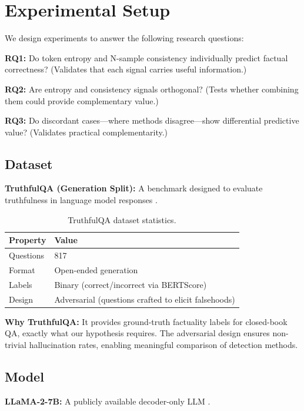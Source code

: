 \section{Experimental Setup}
\label{sec:experiments}

We design experiments to answer the following research questions:

\textbf{RQ1:} Do token entropy and N-sample consistency individually predict factual correctness? (Validates that each signal carries useful information.)

\textbf{RQ2:} Are entropy and consistency signals orthogonal? (Tests whether combining them could provide complementary value.)

\textbf{RQ3:} Do discordant cases---where methods disagree---show differential predictive value? (Validates practical complementarity.)

\subsection{Dataset}

\textbf{TruthfulQA (Generation Split):} A benchmark designed to evaluate truthfulness in language model responses \citep{lin2022truthfulqa}.

\begin{table}[h]
\centering
\begin{tabular}{@{}ll@{}}
\toprule
\textbf{Property} & \textbf{Value} \\
\midrule
Questions & 817 \\
Format & Open-ended generation \\
Labels & Binary (correct/incorrect via BERTScore) \\
Design & Adversarial (questions crafted to elicit falsehoods) \\
\bottomrule
\end{tabular}
\caption{TruthfulQA dataset statistics.}
\label{tab:dataset}
\end{table}

\textbf{Why TruthfulQA:} It provides ground-truth factuality labels for closed-book QA, exactly what our hypothesis requires. The adversarial design ensures non-trivial hallucination rates, enabling meaningful comparison of detection methods.

\subsection{Model}

\textbf{LLaMA-2-7B:} A publicly available decoder-only LLM \citep{touvron2023llama}.

